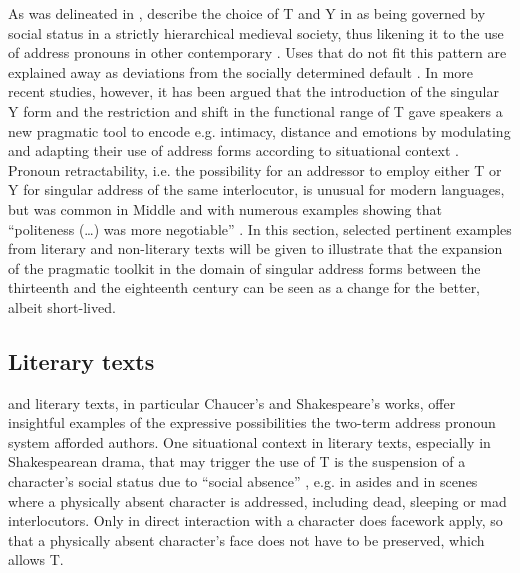 \documentclass[output=paper,hidelinks]{langscibook}
\begin{document}
As was delineated in , \citet{Brown1960} describe the choice of T and Y in  as being governed by social status in a strictly hierarchical medieval society, thus likening it to the use of address pronouns in other contemporary . Uses that do not fit this pattern are explained away as deviations from the socially determined default \parencites[][274--276]{Brown1960}[see][155]{Jucker2000}. In more recent studies, however, it has been argued that the introduction of the singular Y form and the restriction and shift in the functional range of T gave speakers a new pragmatic tool to encode e.g. intimacy, distance and emotions by modulating and adapting their use of address forms according to situational context \citep[158]{Jucker2000}. Pronoun retractability, i.e. the possibility for an addressor to employ either T or Y for singular address of the same interlocutor, is unusual for modern languages, but was common in Middle and  with numerous examples showing that \enquote{politeness (\dots) was more negotiable} \citep[158]{Jucker2000}. In this section, selected pertinent examples from literary and non-literary texts will be given to illustrate that the expansion of the pragmatic toolkit in the domain of singular address forms between the thirteenth and the eighteenth century can be seen as a change for the better, albeit short-lived. 

\subsection{Literary texts}\label{sec:eh:4.1}

 and  literary texts, in particular Chaucer’s and Shakespeare’s works, offer insightful examples of the expressive possibilities the two-term address pronoun system afforded authors.
One situational context in literary texts, especially in Shakespearean drama, that may trigger the use of T is the suspension of a character’s social status due to \enquote{social absence} \parencites[138]{Mazzon2000}[138]{Mazzon2010}, e.g. in asides and in scenes where a physically absent character is addressed, including dead, sleeping or mad interlocutors. Only in direct interaction with a character does facework apply, so that a physically absent character’s face does not have to be preserved, which allows T. 
\end{document}
